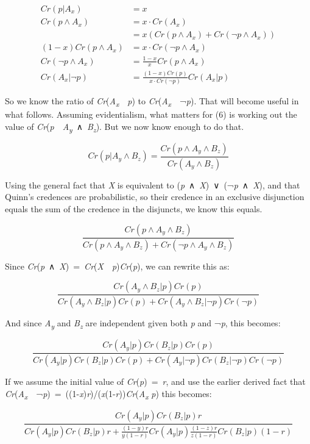 \documentclass[
  11pt,
  letterpaper,
  DIV=11,
  numbers=noendperiod,
  twoside]{scrartcl}
\begin{document}
\[
\begin{aligned}
Cr(p | A_x) &= x \\
Cr(p \wedge A_x) &= x \cdot Cr(A_x) \\
 &= x (Cr(p \wedge A_x) + Cr(\neg p \wedge A_x)) \\
(1-x)Cr(p \wedge A_x) &= x \cdot Cr(\neg p \wedge A_x) \\
Cr(\neg p \wedge A_x) &= \frac{1-x}{x} Cr(p \wedge A_x) \\
Cr(A_x | \neg p) &= \frac{(1-x)Cr(p)}{x\cdot Cr(\neg p)}Cr(A_x | p)
\end{aligned}
\]

So we know the ratio of
\emph{Cr}(\emph{A\textsubscript{x}}~\textbar~\emph{p}) to
\emph{Cr}(\emph{A\textsubscript{x}}~\textbar~¬\emph{p}). That will
become useful in what follows. Assuming evidentialism, what matters for
(6) is working out the value of
\emph{Cr}(\emph{p}~\textbar~\emph{A\textsubscript{y}}~∧~\emph{B\textsubscript{z}}).
But we now know enough to do that.

\[
Cr(p | A_y ∧ B_z) = \frac{Cr(p ∧ A_y ∧ B_z)}{Cr(A_y ∧ B_z)}
\]

Using the general fact that \emph{X} is equivalent to
(\emph{p}~∧~\emph{X})~∨~(¬\emph{p}~∧~\emph{X}), and that Quinn's
credences are probabilistic, so their credence in an exclusive
disjunction equals the sum of the credence in the disjuncts, we know
this equals.

\[
\frac{Cr(p ∧ A_y ∧ B_z)}{Cr(p ∧ A_y ∧ B_z) + Cr(\neg p ∧ A_y ∧ B_z)}
\]

Since
\emph{Cr}(\emph{p}~∧~\emph{X})~=~\emph{Cr}(\emph{X}~\textbar~\emph{p})\emph{Cr}(\emph{p}),
we can rewrite this as:

\[
\frac{Cr(A_y ∧ B_z | p) Cr(p)}{Cr(A_y ∧ B_z | p)Cr(p) + Cr(A_y ∧ B_z | \neg p)Cr(\neg p)}
\]

And since \emph{A\textsubscript{y}} and \emph{B\textsubscript{z}} are
independent given both \emph{p} and ¬\emph{p}, this becomes:

\[
\frac{Cr(A_y| p) Cr(B_z | p) Cr(p)}{Cr(A_y| p) Cr(B_z | p) Cr(p) + Cr(A_y| \neg p) Cr(B_z | \neg p) Cr(\neg p)}
\]

If we assume the initial value of \emph{Cr}(\emph{p})~=~\emph{r}, and
use the earlier derived fact that
\emph{Cr}(\emph{A\textsubscript{x}}~\textbar~¬\emph{p})~=~((1-\emph{x})\emph{r})/(\emph{x}(1-\emph{r}))\emph{Cr}(\emph{A\textsubscript{x}}
\textbar{} \emph{p}) this becomes:

\[
\frac{Cr(A_y| p) Cr(B_z | p)r}{Cr(A_y| p) Cr(B_z | p)r + \frac{(1-y)r}{y(1-r)} Cr(A_y| p) \frac{(1-z)r}{z(1-r)} Cr(B_z | p) (1-r)}
\]
\end{document}
